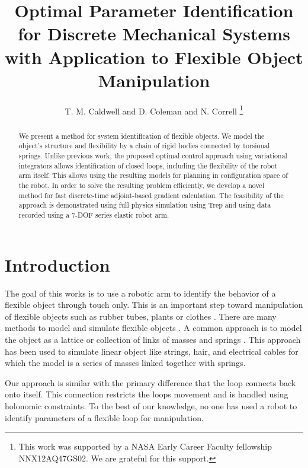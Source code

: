 \documentclass[letterpaper, 10pt, conference]{ieeeconf}
\title{Optimal Parameter Identification for Discrete Mechanical Systems with Application to Flexible Object Manipulation}
\author{T. M. Caldwell and  D. Coleman and N. Correll%
\thanks{
This work was supported by a NASA
Early Career Faculty fellowship NNX12AQ47GS02. We are grateful for this support.}%
}
\begin{document}
\maketitle

\begin{abstract}
We present a method for system identification of flexible objects. We model the object's structure and flexibility by a chain of rigid bodies connected by torsional springs. Unlike previous work, the proposed optimal control approach using variational integrators allows identification of closed loops, including the flexibility of the robot arm itself. This allows using the resulting models for planning in configuration space of the robot. In order to solve the resulting problem efficiently, we develop a novel method for fast discrete-time adjoint-based gradient calculation. The feasibility of the approach is demonstrated using full physics simulation using Trep and using data recorded using a 7-DOF series elastic robot arm.
\end{abstract}

\section{Introduction}
The goal of this works is to use a robotic arm to identify the behavior of a flexible object through touch only. This is an important step toward manipulation of flexible objects such as rubber tubes, plants or clothes \cite{wakamatsu2006knotting,saha2007manipulation,bell2010flexible,jimenez2012survey}.  
There are many methods to model and simulate flexible objects \cite{khalil_payeur, lang_etal}.  A common approach is to model the object as a lattice or collection of links of masses and springs \cite{sahari_etal, wakamatsu_etal, khalil_payeur}.  This approach has been used to simulate linear object like strings, hair, and electrical cables for which the model is a series of masses linked together with springs. %

Our approach is similar with the primary difference that the loop connects back onto itself.  This connection restricts the loops movement and is handled using holonomic constraints.  To the best of our knowledge, no one has used a robot to identify parameters of a flexible loop for manipulation.
\end{document}
